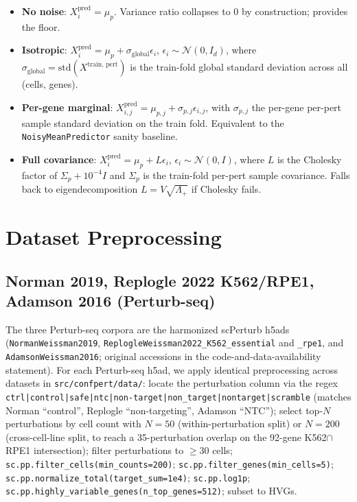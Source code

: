 \documentclass{article}
\begin{document}
\begin{itemize}
\item[\textbf{A}] \textbf{No noise}: $X^{\text{pred}}_i = \mu_p$. Variance ratio collapses to 0 by construction; provides the floor.
\item[\textbf{B}] \textbf{Isotropic}: $X^{\text{pred}}_i = \mu_p + \sigma_{\text{global}} \epsilon_i$, $\epsilon_i \sim \mathcal{N}(0, I_d)$, where $\sigma_{\text{global}} = \mathrm{std}(X^{\text{train, pert}})$ is the train-fold global standard deviation across all (cells, genes).
\item[\textbf{C}] \textbf{Per-gene marginal}: $X^{\text{pred}}_{i, j} = \mu_{p, j} + \sigma_{p, j} \epsilon_{i, j}$, with $\sigma_{p, j}$ the per-gene per-pert sample standard deviation on the train fold. Equivalent to the \texttt{NoisyMeanPredictor} sanity baseline.
\item[\textbf{D}] \textbf{Full covariance}: $X^{\text{pred}}_i = \mu_p + L \epsilon_i$, $\epsilon_i \sim \mathcal{N}(0, I)$, where $L$ is the Cholesky factor of $\Sigma_p + 10^{-4} I$ and $\Sigma_p$ is the train-fold per-pert sample covariance. Falls back to eigendecomposition $L = V \sqrt{\Lambda_+}$ if Cholesky fails.
\end{itemize}

\section{Dataset Preprocessing}
\label{app:datasets}

\subsection{Norman 2019, Replogle 2022 K562/RPE1, Adamson 2016 (Perturb-seq)}
The three Perturb-seq corpora are the harmonized scPerturb h5ads \citep{peidli2024scperturb} (\texttt{NormanWeissman2019}, \texttt{ReplogleWeissman2022\_K562\_essential} and \texttt{\_rpe1}, and \texttt{AdamsonWeissman2016}; original accessions in the code-and-data-availability statement). For each Perturb-seq h5ad, we apply identical preprocessing across datasets in \texttt{src/confpert/data/}: locate the perturbation column via the regex \texttt{ctrl|control|safe|ntc|non-target|non\_target|nontarget|scramble} (matches Norman ``control'', Replogle ``non-targeting'', Adamson ``NTC''); select top-$N$ perturbations by cell count with $N = 50$ (within-perturbation split) or $N = 200$ (cross-cell-line split, to reach a 35-perturbation overlap on the 92-gene K562$\cap$RPE1 intersection); filter perturbations to $\geq 30$ cells; \texttt{sc.pp.filter\_cells(min\_counts=200)}; \texttt{sc.pp.filter\_genes(min\_cells=5)}; \texttt{sc.pp.normalize\_total(target\_sum=1e4)}; \texttt{sc.pp.log1p}; \texttt{sc.pp.highly\_variable\_genes(n\_top\_genes=512)}; subset to HVGs.
\end{document}

